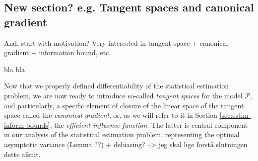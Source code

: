 \documentclass[a4,danish]{article}
\begin{document}

\subsection{New section? e.g. Tangent spaces and canonical gradient}

And, start with motivation? Very interested in tangent space +
canonical gradient + information bound, etc.

bla bla

Now that we properly defined differentiability of the statistical
estimation problem, we are now ready to introduce so-called
\textit{tangent spaces} for the model $\mathcal{P}$, and particularly,
a specific element of closure of the linear space of the tangent space
called the \textit{canonical gradient}, or, as we will refer to it in
Section \ref{sec:estim-inform-bounds}, the \textit{efficient influence
  function}. The latter is central component in our analysis of the
statistical estimation problem, representing the optimal asymptotic
variance (Lemma ??) + debiasing? --> jeg skal lige forstå slutningen
dette afsnit.
\end{document}
